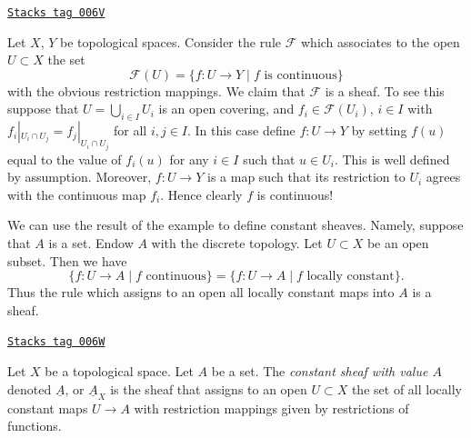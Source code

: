 \begin{example}
\label{sheaves-example-basic-continuous-maps}
\href{https://stacks.math.columbia.edu/tag/006V}{\texttt{Stacks tag 006V}}

Let $X$, $Y$ be topological spaces.
Consider the rule $\mathcal{F}$ which associates to
the open $U \subset X$ the set
$$
\mathcal{F}(U) = \{ f : U \to Y \mid f \text{ is continuous}\}
$$
with the obvious restriction mappings. We claim that
$\mathcal{F}$ is a sheaf. To see this suppose that
$U = \bigcup_{i\in I} U_i$ is an open covering, and
$f_i \in \mathcal{F}(U_i)$, $i\in I$ with
$f_i |_{U_i \cap U_j} = f_j|_{U_i \cap U_j}$ for all $i, j \in I$.
In this case define $f : U \to Y$ by setting $f(u)$
equal to the value of $f_i(u)$ for any $i \in I$ such that
$u \in U_i$. This is well defined by assumption. Moreover,
$f : U \to Y$ is a map such that its restriction to $U_i$
agrees with the continuous map $f_i$. Hence clearly $f$ is
continuous!
\end{example}

We can use the result of the example to define constant
sheaves. Namely, suppose that $A$ is a set. Endow $A$ with
the discrete topology. Let $U \subset X$ be an open subset.
Then we have
$$
\{ f : U \to A \mid f\text{ continuous}\}
=
\{ f : U \to A \mid f\text{ locally constant}\}.
$$
Thus the rule which assigns to an open all locally
constant maps into $A$ is a sheaf.

\begin{definition}
\label{sheaves-definition-constant-sheaf}
\href{https://stacks.math.columbia.edu/tag/006W}{\texttt{Stacks tag 006W}}

Let $X$ be a topological space. Let $A$ be a set.
The {\it constant sheaf with value $A$} denoted $\underline{A}$, or
$\underline{A}_X$ is the sheaf that assigns to an open $U \subset X$
the set of all locally constant maps $U \to A$ with restriction mappings
given by restrictions of functions.
\end{definition}

